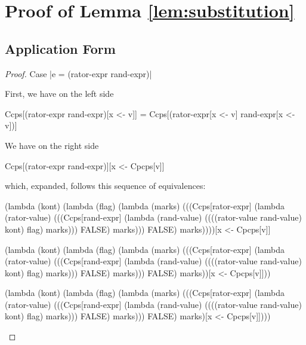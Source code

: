 \chapter{Proof of Lemma \ref{lem:substitution}}
\label{app:substitution}

\section{Application Form}
\begin{proof}{Case \scheme|e = (rator-expr rand-expr)|}

First, we have on the left side
\begin{schemeblock}
\begin{schemedisplay}
Ccps[(rator-expr rand-expr)[x <- v]] = Ccps[(rator-expr[x <- v] rand-expr[x <- v])]
\end{schemedisplay}
\end{schemeblock}

We have on the right side
\begin{schemeblock}
\begin{schemedisplay}
Ccps[(rator-expr rand-expr)][x <- Cpcps[v]]
\end{schemedisplay}
\end{schemeblock}
which, expanded, follows this sequence of equivalences:

\begin{schemeblock}
\begin{schemedisplay}
(lambda (kont)
   (lambda (flag)
     (lambda (marks)
       (((Ccps[rator-expr]
          (lambda (rator-value)
            (((Ccps[rand-expr]
               (lambda (rand-value)
                 ((((rator-value rand-value) kont) flag) marks)))
              FALSE) marks)))
         FALSE) marks))))[x <- Cpcps[v]]
\end{schemedisplay}
\end{schemeblock}

\begin{schemeblock}
\begin{schemedisplay}
(lambda (kont)
   (lambda (flag)
     (lambda (marks)
       (((Ccps[rator-expr]
          (lambda (rator-value)
            (((Ccps[rand-expr]
               (lambda (rand-value)
                 ((((rator-value rand-value) kont) flag) marks)))
              FALSE) marks)))
         FALSE) marks))[x <- Cpcps[v]]))
\end{schemedisplay}
\end{schemeblock}

\begin{schemeblock}
\begin{schemedisplay}
(lambda (kont)
   (lambda (flag)
     (lambda (marks)
       (((Ccps[rator-expr]
          (lambda (rator-value)
            (((Ccps[rand-expr]
               (lambda (rand-value)
                 ((((rator-value rand-value) kont) flag) marks)))
              FALSE) marks)))
         FALSE) marks)[x <- Cpcps[v]])))
\end{schemedisplay}
\end{schemeblock}


\end{proof}
